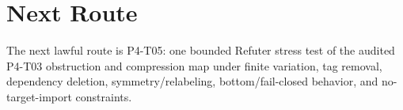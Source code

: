 \documentclass[11pt]{article}
\begin{document}
\section{Next Route}

The next lawful route is P4-T05: one bounded Refuter stress test of the
audited P4-T03 obstruction and compression map under finite variation, tag
removal, dependency deletion, symmetry/relabeling, bottom/fail-closed
behavior, and no-target-import constraints.
\end{document}
